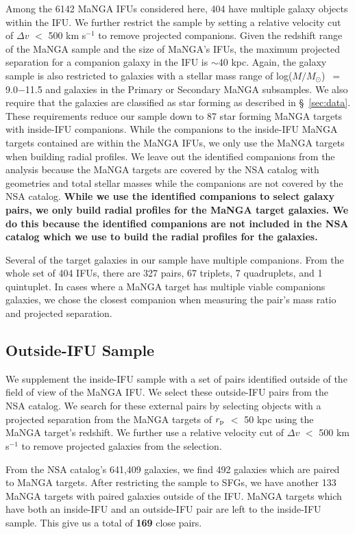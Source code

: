 \documentclass[iop,revtex4,twocolumn,apj,numberedappendix,appendixfloats]{emulateapj}
\newcommand{\logm}{log($M/M_{\odot}$)}
\begin{document}
Among the 6142 MaNGA IFUs considered here, 404 have multiple galaxy objects within the IFU. We further restrict the sample by setting a relative velocity cut of $\Delta v$ $<$ 500 km s$^{-1}$ to remove projected companions. Given the redshift range of the MaNGA sample and the size of MaNGA's IFUs, the maximum projected separation for a companion galaxy in the IFU is $\sim$40 kpc. Again, the galaxy sample is also restricted to galaxies with a stellar mass range of \logm\ $=$ 9.0$-$11.5 and galaxies in the Primary or Secondary MaNGA subsamples. We also require that the galaxies are classified as star forming as described in \S~\ref{sec:data}. These requirements reduce our sample down to 87 star forming MaNGA targets with inside-IFU companions. While the companions to the inside-IFU MaNGA targets contained are within the MaNGA IFUs, we only use the MaNGA targets when building radial profiles. We leave out the identified companions from the analysis because the MaNGA targets are covered by the NSA catalog with geometries and total stellar masses while the companions are not covered by the NSA catalog. \textbf{While we use the identified companions to select galaxy pairs, we only build radial profiles for the MaNGA target galaxies. We do this because the identified companions are not included in the NSA catalog which we use to build the radial profiles for the galaxies.}

Several of the target galaxies in our sample have multiple companions. From the whole set of 404 IFUs, there are 327 pairs, 67 triplets, 7 quadruplets, and 1 quintuplet. In cases where a MaNGA target has multiple viable companions galaxies, we chose the closest companion when measuring the pair's mass ratio and projected separation. 

\subsection{Outside-IFU Sample}\label{sec:outside}

We supplement the inside-IFU sample with a set of pairs identified outside of the field of view of the MaNGA IFU. We select these outside-IFU pairs from the NSA catalog. We search for these external pairs by selecting objects with a projected separation from the MaNGA targets of $r_{\rm p}$ $<$ 50 kpc using the MaNGA target's redshift. We further use a relative velocity cut of $\Delta v$ $<$ 500 km s$^{-1}$ to remove projected galaxies from the selection. 

From the NSA catalog's 641,409 galaxies, we find 492 galaxies which are paired to MaNGA targets. After restricting the sample to SFGs, we have another 133 MaNGA targets with paired galaxies outside of the IFU. MaNGA targets which have both an inside-IFU and an outside-IFU pair are left to the inside-IFU sample. This give us a total of \textbf{169} close pairs.
\end{document}
